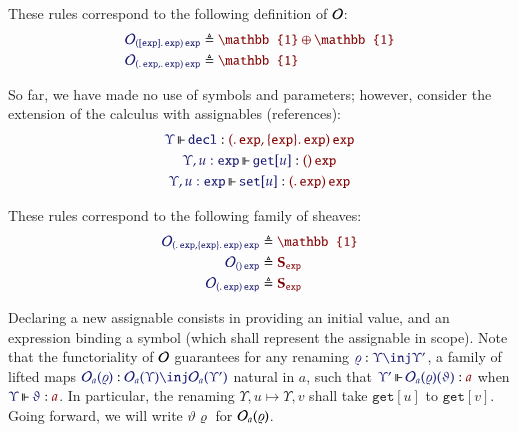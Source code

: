 \documentclass[11pt]{article}
\theoremstyle{definition}
\theoremstyle{remark}
\numberwithin{equation}{section}
\newcommand\SortExp{\mathtt{exp}}
\begin{document}
These rules correspond to the following definition of $\mathcal{O}$:
\begin{align*}
  \ADefine{
    \Operators_{
       \MkArity{
        \MkValence{}{\SortExp}{\SortExp}
      }{\SortExp}
    }
  }{
    \mathbb{1}\oplus\mathbb{1}
  }
  \\
  \ADefine{
    \Operators_{
      \MkArity{
        \MkValence{}{}{\SortExp},
        \MkValence{}{}{\SortExp}
      }{\SortExp}
    }
  }{
    \mathbb{1}
  }
\end{align*}

So far, we have made no use of symbols and parameters; however, consider the
extension of the calculus with assignables (references):
%
\begin{gather*}
  \IsOperator{\Upsilon}{\mathtt{decl}}{
    \MkArity{
      \MkValence{}{}{\SortExp},
      \MkValence{\SortExp}{}{\SortExp}
    }{
      \SortExp
    }
  }
\\
  \IsOperator{\Upsilon,u:\SortExp}{\mathtt{get}[u]}{
    \MkArity{}{\SortExp}
  }
\\
  \IsOperator{\Upsilon,u:\SortExp}{\mathtt{set}[u]}{
    \MkArity{
      \MkValence{}{}{\SortExp}
    }{
      \SortExp
    }
  }
\end{gather*}

These rules correspond to the following family of sheaves:
\begin{align*}
  \ADefine{
    \Operators_{
      \MkArity{
        \MkValence{}{}{\SortExp},
        \MkValence{\SortExp}{}{\SortExp}
      }{
        \SortExp
      }
    }
  }{
    \mathbb{1}
  }\\
  \ADefine{
    \Operators_{
      \MkArity{}{\SortExp}
    }
  }{
    \mathbf{S}_\SortExp
  }\\
  \ADefine{
    \Operators_{
      \MkArity{
        \MkValence{}{}{\SortExp}
      }{
        \SortExp
      }
    }
  }{
    \mathbf{S}_\SortExp
  }
\end{align*}

Declaring a new assignable consists in providing an initial value, and an
expression binding a symbol (which shall represent the assignable in scope).
Note that the functoriality of $\mathcal{O}$ guarantees for any renaming
$\Of{\varrho}{\Upsilon\inj\Upsilon'}$, a family of lifted maps
$\Of{\Operators_a(\varrho)}{\Operators_a(\Upsilon)\inj\Operators_a(\Upsilon')}$
natural in $a$, such that
$\IsOperator{\Upsilon'}{\Operators_a(\varrho)(\vartheta)}{a}$ when
$\IsOperator{\Upsilon}{\vartheta}{a}$. In particular, the renaming
$\Upsilon,u\mapsto\Upsilon,v$ shall take $\mathtt{get}[u]$ to
$\mathtt{get}[v]$. Going forward, we will write $\vartheta\varrho$ for
$\mathcal{O}_a(\varrho)$.
\end{document}

